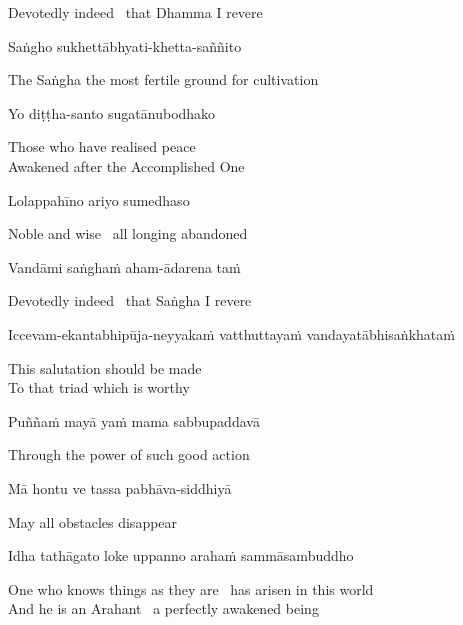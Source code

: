 \begin{english}
  Devotedly indeed \breathmark\ that Dhamma I revere
\end{english}

Saṅgho sukhettābhyati-khetta-saññito

\begin{english}
  The Saṅgha the most fertile ground for cultivation
\end{english}

Yo diṭṭha-santo sugatānubodhako

\begin{english}
  Those who have realised peace\\
  Awakened after the Accomplished One
\end{english}

Lolappahīno ariyo sumedhaso

\begin{english}
  Noble and wise \breathmark\ all longing abandoned
\end{english}

Vandāmi saṅghaṁ aham-ādarena taṁ

\begin{english}
  Devotedly indeed \breathmark\ that Saṅgha I revere
\end{english}

Iccevam-ekantabhipūja-neyyakaṁ vatthuttayaṁ vandayatābhisaṅkhataṁ

\begin{english}
  This salutation should be made\\
  To that triad
  which is worthy
\end{english}

Puññaṁ mayā yaṁ mama sabbupaddavā

\begin{english}
  Through the power of such good action
\end{english}

Mā hontu ve tassa pabhāva-siddhiyā

\begin{english}
  May all obstacles disappear
\end{english}

Idha tathāgato loke uppanno arahaṁ sammāsambuddho

\begin{english}
  One who knows things as they are \breathmark\ has arisen in this world\\
  And he is an Arahant \breathmark\ a perfectly awakened being
\end{english}

